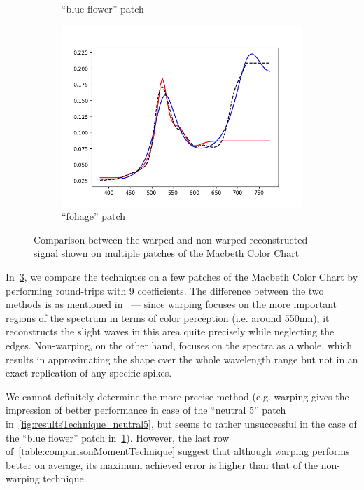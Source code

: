 \begin{figure}[t]
\begin{subfigure}[t]{0.45\textwidth}
		\caption{``blue flower'' patch}
		\label{fig:resultsTechnique_blueFlower}
	\end{subfigure} \hspace{0.1em}
	\begin{subfigure}[t]{0.45\textwidth}
		\includegraphics[width=\linewidth]{img/results_techniqueFoliage.png}
		\caption{``foliage'' patch}
		\label{fig:resultsTechnique_foliage}
	\end{subfigure}
	\caption{Comparison between the warped and non-warped reconstructed signal shown on multiple patches of the Macbeth Color Chart}
	\label{fig:resultsTechniques}
\end{figure}

In~\cref{fig:resultsTechniques}, we compare the techniques on a few patches of the Macbeth Color Chart by performing round-trips with 9 coefficients. The difference between the two methods is as mentioned in~\citet{trigonometricMomentsPaper} --- since warping focuses on the more important regions of the spectrum in terms of color perception (i.e. around 550nm), it reconstructs the slight waves in this area quite precisely while neglecting the edges. Non-warping, on the other hand, focuses on the spectra as a whole, which results in approximating the shape over the whole wavelength range but not in an exact replication of any specific spikes.

We cannot definitely determine the more precise method (e.g. warping gives the impression of better performance in case of the ``neutral 5'' patch in~\cref{fig:resultsTechnique_neutral5}, but seems to rather unsuccessful in the case of the ``blue flower'' patch in~\cref{fig:resultsTechnique_blueFlower}). However, the last row of~\cref{table:comparisonMomentTechnique} suggest that although warping performs better on average, its maximum achieved error is higher than that of the non-warping technique.


